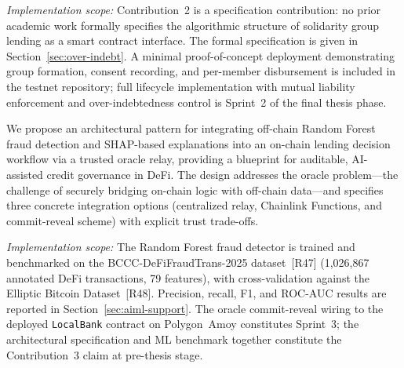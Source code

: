 \documentclass[12pt,a4paper]{report}
\begin{document}
\begin{description}[leftmargin=0pt]
\textit{Implementation scope:} Contribution~2 is a specification contribution: no prior academic work formally specifies the algorithmic structure of solidarity group lending as a smart contract interface. The formal specification is given in Section~\ref{sec:over-indebt}. A minimal proof-of-concept deployment demonstrating group formation, consent recording, and per-member disbursement is included in the testnet repository; full lifecycle implementation with mutual liability enforcement and over-indebtedness control is Sprint~2 of the final thesis phase.

\item[\textbf{Contribution 3 --- Oracle-Mediated AI/ML Integration with Explainability.}]
We propose an architectural pattern for integrating off-chain Random Forest fraud detection and SHAP-based explanations into an on-chain lending decision workflow via a trusted oracle relay, providing a blueprint for auditable, AI-assisted credit governance in DeFi. The design addresses the oracle problem---the challenge of securely bridging on-chain logic with off-chain data---and specifies three concrete integration options (centralized relay, Chainlink Functions, and commit-reveal scheme) with explicit trust trade-offs.

\textit{Implementation scope:} The Random Forest fraud detector is trained and benchmarked on the BCCC-DeFiFraudTrans-2025 dataset~[R47] (1,026,867 annotated DeFi transactions, 79 features), with cross-validation against the Elliptic Bitcoin Dataset~[R48]. Precision, recall, F1, and ROC-AUC results are reported in Section~\ref{sec:aiml-support}. The oracle commit-reveal wiring to the deployed \texttt{LocalBank} contract on Polygon~Amoy constitutes Sprint~3; the architectural specification and ML benchmark together constitute the Contribution~3 claim at pre-thesis stage.


\end{description}
\end{document}
